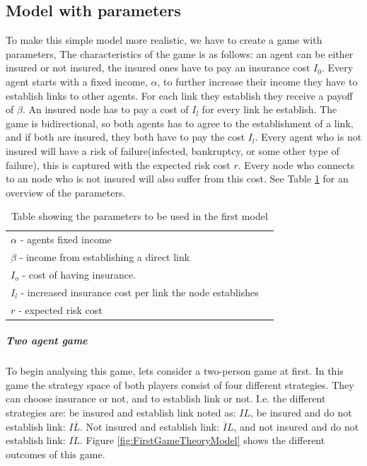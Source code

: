 \subsection{Model with parameters}
To make this simple model more realistic, we have to create a game with parameters, The characteristics of the game is as follows: an agent can be either insured or not insured, the insured ones have to pay an insurance cost $I_{0}$. Every agent starts with a fixed income, $\alpha$, to further increase their income they have to establish links to other agents. For each link they establish they receive a payoff of $\beta$. An insured node has to pay a cost of $I_{l}$ for every link he establish. The game is bidirectional, so both agents has to agree to the establishment of a link, and if both are insured, they both have to pay the cost $I_{l}$. 
Every agent who is not insured will have a risk of failure(infected, bankruptcy, or some other type of failure), this is captured with the expected risk cost $r$. Every node who connects to an node who is not insured will also suffer from this cost. See Table \ref{tbl:simplegamepara} for an overview of the parameters. 
\begin{table}[h]
\centering
\begin{tabular}{lc}
 \hline
  $\alpha$ - agents fixed income\\
  $\beta$ - income from establishing a direct link \\
  $I_{o}$ - cost of having insurance. \\
  $I_{l}$ - increased insurance cost per link the node establishes\\
  $r$ - expected risk cost\\
  \hline
\end{tabular}
\caption{Table showing the parameters to be used in the first model \label{tbl:simplegamepara}}
\end{table}
\subparagraph{Two agent game}
To begin analysing this game, lets consider a two-person game at first. In this game the strategy space of both players consist of four different strategies. They can choose insurance or not, and to establish link or not. I.e. the different strategies are: be insured and establish link noted as: $IL$, 
be insured and do not establish link: $I\overline{L}$. Not insured and establish link: $\overline{I}L$, and not insured and do not establish link: $\overline{IL}$.
Figure \ref{fig:FirstGameTheoryModel} shows the different outcomes of this game.

